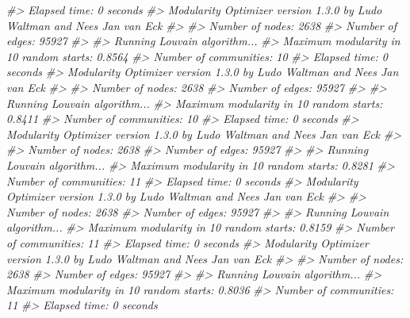 \documentclass[
]{book}
\newenvironment{Shaded}{\begin{snugshade}}{\end{snugshade}}
\newcommand{\CommentTok}[1]{\textcolor[rgb]{0.56,0.35,0.01}{\textit{#1}}}
\begin{document}
\begin{Shaded}
\begin{Highlighting}[]
\CommentTok{\#\textgreater{} Elapsed time: 0 seconds}
\CommentTok{\#\textgreater{} Modularity Optimizer version 1.3.0 by Ludo Waltman and Nees Jan van Eck}
\CommentTok{\#\textgreater{} }
\CommentTok{\#\textgreater{} Number of nodes: 2638}
\CommentTok{\#\textgreater{} Number of edges: 95927}
\CommentTok{\#\textgreater{} }
\CommentTok{\#\textgreater{} Running Louvain algorithm...}
\CommentTok{\#\textgreater{} Maximum modularity in 10 random starts: 0.8564}
\CommentTok{\#\textgreater{} Number of communities: 10}
\CommentTok{\#\textgreater{} Elapsed time: 0 seconds}
\CommentTok{\#\textgreater{} Modularity Optimizer version 1.3.0 by Ludo Waltman and Nees Jan van Eck}
\CommentTok{\#\textgreater{} }
\CommentTok{\#\textgreater{} Number of nodes: 2638}
\CommentTok{\#\textgreater{} Number of edges: 95927}
\CommentTok{\#\textgreater{} }
\CommentTok{\#\textgreater{} Running Louvain algorithm...}
\CommentTok{\#\textgreater{} Maximum modularity in 10 random starts: 0.8411}
\CommentTok{\#\textgreater{} Number of communities: 10}
\CommentTok{\#\textgreater{} Elapsed time: 0 seconds}
\CommentTok{\#\textgreater{} Modularity Optimizer version 1.3.0 by Ludo Waltman and Nees Jan van Eck}
\CommentTok{\#\textgreater{} }
\CommentTok{\#\textgreater{} Number of nodes: 2638}
\CommentTok{\#\textgreater{} Number of edges: 95927}
\CommentTok{\#\textgreater{} }
\CommentTok{\#\textgreater{} Running Louvain algorithm...}
\CommentTok{\#\textgreater{} Maximum modularity in 10 random starts: 0.8281}
\CommentTok{\#\textgreater{} Number of communities: 11}
\CommentTok{\#\textgreater{} Elapsed time: 0 seconds}
\CommentTok{\#\textgreater{} Modularity Optimizer version 1.3.0 by Ludo Waltman and Nees Jan van Eck}
\CommentTok{\#\textgreater{} }
\CommentTok{\#\textgreater{} Number of nodes: 2638}
\CommentTok{\#\textgreater{} Number of edges: 95927}
\CommentTok{\#\textgreater{} }
\CommentTok{\#\textgreater{} Running Louvain algorithm...}
\CommentTok{\#\textgreater{} Maximum modularity in 10 random starts: 0.8159}
\CommentTok{\#\textgreater{} Number of communities: 11}
\CommentTok{\#\textgreater{} Elapsed time: 0 seconds}
\CommentTok{\#\textgreater{} Modularity Optimizer version 1.3.0 by Ludo Waltman and Nees Jan van Eck}
\CommentTok{\#\textgreater{} }
\CommentTok{\#\textgreater{} Number of nodes: 2638}
\CommentTok{\#\textgreater{} Number of edges: 95927}
\CommentTok{\#\textgreater{} }
\CommentTok{\#\textgreater{} Running Louvain algorithm...}
\CommentTok{\#\textgreater{} Maximum modularity in 10 random starts: 0.8036}
\CommentTok{\#\textgreater{} Number of communities: 11}
\CommentTok{\#\textgreater{} Elapsed time: 0 seconds}

\end{Highlighting}
\end{Shaded}
\end{document}
